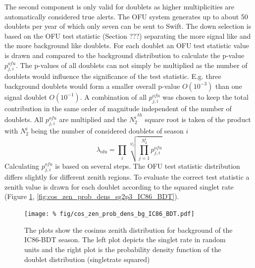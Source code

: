 The second component is only valid for doublets as higher multiplicities are 
automatically considered true alerts. The OFU system generates up to about 50 
doublets per year of which only seven can be sent to Swift. The down selection 
is based on the OFU test statistic (Section ???) separating the more signal 
like and the more background like doublets. For each doublet an OFU test 
statistic value is drawn and compared to the background distribution to 
calculate the p-value $p_{j, i}^{ofu}$. The p-values of all doublets can not 
simply be multiplied as the number of doublets would influence the significance 
of the test statistic. E.g. three background doublets would form a smaller 
overall p-value $O(10^{-3})$ than one signal doublet $O(10^{-1})$. A combination 
of all $p_{j,i}^{ofu}$ was chosen to keep the total contribution in the same 
order of magnitude independent of the number of doublets.
All $p_{j,i}^{ofu}$ are multiplied and 
the ${N_2^i}^{th}$ square root is taken of the product with $N_2^i$ being the 
number of considered 
doublets of season $i$
\begin{equation}
\label{eq:lambda_ofu}
 \lambda_\text{ofu} = \prod_i \sqrt[N_2^i]{\prod_{j=1}^{N_2^i} p_{j,i}^{ofu}}
\end{equation}
Calculating $p_{j,i}^{ofu}$ is based on several steps. The OFU test statistic 
distribution differs slightly for different zenith regions. To evaluate the 
correct test 
statistic a zenith value is drawn for each doublet according to the squared 
singlet rate (Figure \ref{fig:cos_zen_prob_dens_bg_IC86_BDT}, 
\ref{fig:cos_zen_prob_dens_sg2p3_IC86_BDT}). 

\begin{figure}[h]
\centering
 \captionsetup{width=.85\textwidth}
\texttt{[image: \%
fig/cos\_zen\_prob\_dens\_bg\_IC86\_BDT.pdf]}
 \caption{The plots show the cosinus zenith distribution for background of the 
IC86-BDT season. The left plot depicts the singlet rate in random units and the 
right plot is the probability density function of the doublet distribution 
(singletrate squared)}
\label{fig:cos_zen_prob_dens_bg_IC86_BDT}
\end{figure}

